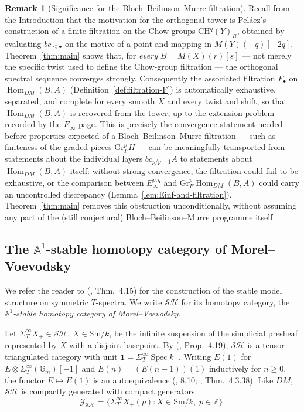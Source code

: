 \documentclass[12pt,a4paper]{article}
\theoremstyle{definition}
\newtheorem{remark}[theorem]{Remark}
\newcommand{\Sm}{\mathrm{Sm}}
\newcommand{\SH}{\mathcal{SH}}
\newcommand{\Hom}{\operatorname{Hom}}
\newcommand{\Gr}{\mathrm{Gr}}
\newcommand{\CH}{\mathrm{CH}}
\newcommand{\Z}{\mathbb{Z}}
\newcommand{\Gm}{\mathbb{G}_m}
\begin{document}
\begin{remark}[Significance for the Bloch--Beilinson--Murre filtration]
\label{rem:BBM-significance}
Recall from the Introduction that the motivation for the orthogonal tower is
Peláez's construction of a finite filtration on the Chow groups $\CH^q(Y)_R$,
obtained by evaluating $bc_{\leq\bullet}$ on the motive of a point and mapping in
$M(Y)(-q)[-2q]$.  Theorem~\ref{thm:main} shows that, for \emph{every}
$B=M(X)(r)[s]$ — not merely the specific twist used to define the Chow-group
filtration — the orthogonal spectral sequence converges strongly.  Consequently
the associated filtration $F_\bullet$ on $\Hom_{DM}(B,A)$
(Definition~\ref{def:filtration-F}) is automatically exhaustive, separated, and
complete for every smooth $X$ and every twist and shift, so that
$\Hom_{DM}(B,A)$ is recovered from the tower, up to the extension problem
recorded by the $E_\infty$-page.  This is precisely the convergence statement
needed before properties expected of a Bloch--Beilinson--Murre filtration — such
as finiteness of the graded pieces $\Gr_F^pH$ — can be meaningfully transported
from statements about the individual layers $bc_{p/p-1}A$ to statements about
$\Hom_{DM}(B,A)$ itself: without strong convergence, the filtration could fail to
be exhaustive, or the comparison between $E_\infty^{p,q}$ and
$\Gr_F^p\Hom_{DM}(B,A)$ could carry an uncontrolled discrepancy
(Lemma~\ref{lem:Einf-and-filtration}).  Theorem~\ref{thm:main} removes this
obstruction unconditionally, without assuming any part of the (still
conjectural) Bloch--Beilinson--Murre programme itself.
\end{remark}

\subsection{The $\mathbb{A}^1$-stable homotopy category of Morel--Voevodsky}
\label{subsec:SH}

We refer the reader to (\cite{Jar00}, Thm.\ 4.15) for the construction of the
stable model structure on symmetric $T$-spectra.  We write $\SH$ for its homotopy
category, the \emph{$\mathbb{A}^1$-stable homotopy category of Morel--Voevodsky}.

Let $\Sigma_T^\infty X_+\in\SH$, $X\in\Sm/k$, be the infinite suspension of the
simplicial presheaf represented by $X$ with a disjoint basepoint.  By
(\cite{Jar00}, Prop.\ 4.19), $\SH$ is a tensor triangulated category with unit
$\mathbf{1}=\Sigma_T^\infty\operatorname{Spec} k_+$.  Writing $E(1)$ for
$E\otimes\Sigma_T^\infty(\Gm)[-1]$ and $E(n)=(E(n-1))(1)$ inductively for $n\geq 0$,
the functor $E\mapsto E(1)$ is an autoequivalence (\cite{Hov01}, 8.10;
\cite{Ayo07}, Thm.\ 4.3.38).  Like $DM$, $\SH$ is compactly generated with compact
generators
\[
  \mathcal{G}_{\SH} = \bigl\{\Sigma_T^\infty X_+(p): X\in\Sm/k,\; p\in\Z\bigr\}.
\]
\end{document}
